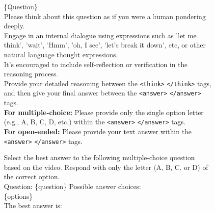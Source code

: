 \documentclass{llmxive}
\begin{document}
\begin{figure}[h]
\begin{tcolorbox}[colback=black!7.5!white, colframe=black!80!white, title=All Benchmarks -- For Video-R1 and VideoRFT, fontupper=\footnotesize, fontlower=\footnotesize, fonttitle=\footnotesize]

\{Question\}\\
Please think about this question as if you were a human pondering deeply.\\
Engage in an internal dialogue using expressions such as 'let me think', 'wait', 'Hmm', 'oh, I see', 'let's break it down', etc, or other natural language thought expressions.\\
It's encouraged to include self-reflection or verification in the reasoning process.\\
Provide your detailed reasoning between the \texttt{<think>} \texttt{</think>} tags, and then give your final answer between the \texttt{<answer>} \texttt{</answer>} tags.\\
\textbf{For multiple-choice:} Please provide only the single option letter (e.g., A, B, C, D, etc.) within the \texttt{<answer>} \texttt{</answer>} tags.\\
\textbf{For open-ended:} Please provide your text answer within the \texttt{<answer>} \texttt{</answer>} tags.

\end{tcolorbox}

\end{figure}

\begin{figure}[h]
\begin{tcolorbox}[colback=black!7.5!white, colframe=black!80!white, title=Video-MME\space \textbar\space MVBench -- For Qwen series instruct models, fontupper=\footnotesize, fontlower=\footnotesize, fonttitle=\footnotesize]

Select the best answer to the following multiple-choice question based on the video.
Respond with only the letter (A, B, C, or D) of the correct option.\\
Question: \{question\} Possible answer choices:\\
\{options\}\\
The best answer is:
\end{tcolorbox}

\end{figure}
\end{document}
